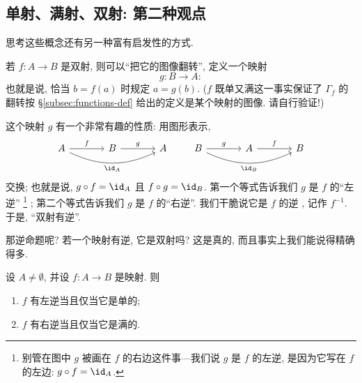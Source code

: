 \subsection{单射、满射、双射: 第二种观点}
\label{subsec:second-viewpoint}

思考这些概念还有另一种富有启发性的方式.

若 $f : A \to B$ 是双射, 则可以``把它的图像翻转'', 定义一个映射
\[
g : B \to A:
\]
也就是说, 恰当 $b = f(a)$ 时规定 $a = g(b)$. ($f$ 既单又满这一事实保证了 $\Gamma_f$ 的翻转按 \S\ref{subsec:functions-def} 给出的定义是某个映射的图像. 请自行验证!)

这个映射 $g$ 有一个非常有趣的性质: 用图形表示,
\[
\begin{tikzcd}[column sep=large]
A \ar[r,"f"] \ar[rr,bend right=25,"\id_A"'] & B \ar[r,"g"] & A
\end{tikzcd}
\qquad
\begin{tikzcd}[column sep=large]
B \ar[r,"g"] \ar[rr,bend right=25,"\id_B"'] & A \ar[r,"f"] & B
\end{tikzcd}
\]
交换; 也就是说, $g \circ f = \id_A$ 且 $f \circ g = \id_B$. 第一个等式告诉我们 $g$ 是 $f$ 的``左逆''%
\footnote{别管在图中 $g$ 被画在 $f$ 的右边这件事---我们说 $g$ 是 $f$ 的左逆, 是因为它写在 $f$ 的左边: $g \circ f = \id_A$.}%
; 第二个等式告诉我们 $g$ 是 $f$ 的``右逆''. 我们干脆说它是 $f$ 的逆%
, 记作 $f^{-1}$. 于是, ``双射有逆''.

那逆命题呢? 若一个映射有逆, 它是双射吗? 这是真的, 而且事实上我们能说得精确得多.

\begin{proposition}
\label{prop:left-right-inverse}
设 $A \neq \emptyset$, 并设 $f : A \to B$ 是映射. 则
\begin{enumerate}
	\item $f$ 有左逆当且仅当它是单的;
	\item $f$ 有右逆当且仅当它是满的.
\end{enumerate}
\end{proposition}

